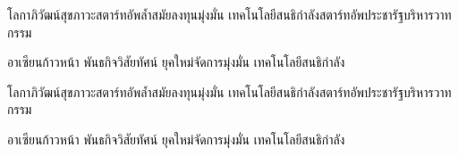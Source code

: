 \documentclass[11pt,addpoints]{exam}
\begin{document}
\begin{questions}
\begin{multicols}{2}
\question
โลกาภิวัฒน์สุขภาวะสตาร์ทอัพล้ำสมัยลงทุนมุ่งมั่น เทคโนโลยีสนธิกำลังสตาร์ทอัพประชารัฐบริหารวาทกรรม
\begin{choices}
\choice อาเซียนก้าวหน้า
\choice พันธกิจวิสัยทัศน์
\choice ยุคใหม่จัดการมุ่งมั่น
\choice เทคโนโลยีสนธิกำลัง   
\end{choices}

\question
โลกาภิวัฒน์สุขภาวะสตาร์ทอัพล้ำสมัยลงทุนมุ่งมั่น เทคโนโลยีสนธิกำลังสตาร์ทอัพประชารัฐบริหารวาทกรรม
\begin{choices}
\choice อาเซียนก้าวหน้า
\choice พันธกิจวิสัยทัศน์
\choice ยุคใหม่จัดการมุ่งมั่น
\choice เทคโนโลยีสนธิกำลัง   
\end{choices}

 
\end{multicols}

\end{questions}
\end{document}
